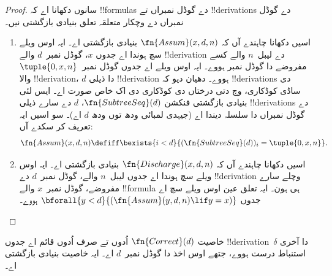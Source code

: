 \documentclass[../../../include/open-logic-section]{subfiles}
\begin{document}
\begin{proof}
  سانوں دکھانا اے کہ !!{formula}s دے گوڈل
  نمبراں تے !!{derivation}s دے گوڈل نمبراں
  دے وچکار متعلقہ تعلق بنیادی بازگشتی نیں۔
  \begin{enumerate}
  \item اسیں دکھانا چاہندے آں کہ
    $\fn{Assum}(x, d, n)$ بنیادی بازگشتی اے۔
    ایہ اوس ویلے سچ ہوندا اے جدوں $x$،
    گوڈل نمبر~$d$ والے !!{derivation}
    دے لیبل~$n$ والے کسے مفروضے دا گوڈل
    نمبر ہووے۔ ایہ اوس ویلے اے جدوں
    گوڈل نمبر~$\tuple{0, x, n}$ والا
    !!{derivation}، $d$ دا ذیلی
    !!{derivation} ہووے۔ دھیان دیو کہ
    !!{derivation}s دی ساڈی کوڈکاری،
     وچ دتی
    درختاں دی کوڈکاری دی اک خاص صورت اے۔
    ایس لئی بنیادی بازگشتی فنکشن
    $\fn{SubtreeSeq}(d)$، $d$ دے سارے
    ذیلی !!{derivation}s دے گوڈل نمبراں
    دا سلسلہ دیندا اے (جیہدی لمبائی ودھ توں ودھ $d$ اے)۔
    سو اسیں ایہ تعریف کر سکدے آں:
    \[
    \fn{Assum}(x, d, n) \defiff \bexists{i<d}{(\fn{SubtreeSeq}(d))_i =
      \tuple{0, x, n}}.
    \]
  \item اسیں دکھانا چاہندے آں کہ
    $\fn{Discharge}(x, d, n)$ بنیادی
    بازگشتی اے۔ ایہ اوس ویلے سچ ہوندا
    اے جدوں لیبل~$n$ والے،
    گوڈل نمبر~$d$ دے
    !!{derivation} وچلے سارے
    مفروضے، گوڈل نمبر~$x$
    والے !!{formula} ہی ہون۔
    ایہ تعلق عین اوس ویلے سچ اے جدوں
    $\bforall{y<d}{(\fn{Assum}(y, d, n) \lif y
      = x)}$ ہووے۔
  \end{enumerate}
\end{proof}

\begin{prop}
  خاصیت $\fn{Correct}(d)$ اُدوں تے صرف اُدوں قائم اے جدوں
!!{derivation}~$\delta$ دا آخری استنباط درست ہووے، جتھے اوس اخذ
دا گوڈل نمبر~$d$ اے۔ ایہ خاصیت بنیادی بازگشتی اے۔
\end{prop}
\end{document}
